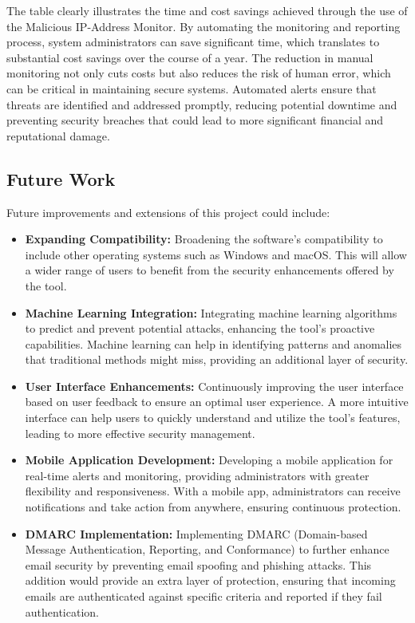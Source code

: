 \documentclass{article}
\begin{document}
    \noindent The table clearly illustrates the time and cost savings achieved through the use of the Malicious IP-Address Monitor.
    By automating the monitoring and reporting process, system administrators can save significant time, which translates to substantial cost savings over the course of a year.
    The reduction in manual monitoring not only cuts costs but also reduces the risk of human error, which can be critical in maintaining secure systems.
    Automated alerts ensure that threats are identified and addressed promptly, reducing potential downtime and preventing security breaches that could lead to more significant financial and reputational damage.

    \newpage
    \subsection{Future Work}\label{subsec:Futur Work}
    Future improvements and extensions of this project could include:

    \begin{itemize}
        \item \textbf{Expanding Compatibility:} Broadening the software's compatibility to include other operating systems such as Windows and macOS. This will allow a wider range of users to benefit from the security enhancements offered by the tool.
        \item \textbf{Machine Learning Integration:} Integrating machine learning algorithms to predict and prevent potential attacks, enhancing the tool's proactive capabilities.
        Machine learning can help in identifying patterns and anomalies that traditional methods might miss, providing an additional layer of security.
        \item \textbf{User Interface Enhancements:} Continuously improving the user interface based on user feedback to ensure an optimal user experience.
        A more intuitive interface can help users to quickly understand and utilize the tool's features, leading to more effective security management.
        \item \textbf{Mobile Application Development:} Developing a mobile application for real-time alerts and monitoring, providing administrators with greater flexibility and responsiveness.
        With a mobile app, administrators can receive notifications and take action from anywhere, ensuring continuous protection.
        \item \textbf{DMARC Implementation:} Implementing DMARC (Domain-based Message Authentication, Reporting, and Conformance) to further enhance email security by preventing email spoofing and phishing attacks.
        This addition would provide an extra layer of protection, ensuring that incoming emails are authenticated against specific criteria and reported if they fail authentication.
    \end{itemize}
\end{document}
